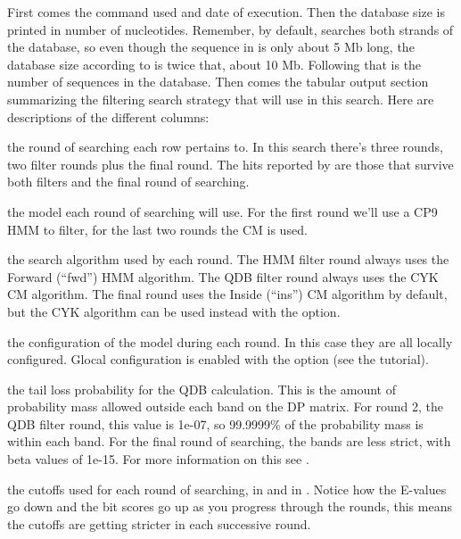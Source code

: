 First comes the command used and date of execution. Then the database
size is printed in number of nucleotides. Remember, by default,
 searches both strands of the database, so even though
the sequence in  is only about 5 Mb
long, the database size according to  is twice that,
about 10 Mb. Following that is the number of sequences in the
database. Then comes the tabular output section summarizing the
filtering search strategy that  will use in this
search. Here are descriptions of the different columns:

\begin{wideitem}
\item[\emprog{rnd}] the round of searching each row pertains
  to. In this search there's three rounds, two filter rounds plus
  the final round. The hits reported by  are those that
  survive both filters and the final round of searching.

\item[\emprog{mod}] the model each round of searching will use. For
  the first round we'll use a CP9 HMM to filter, for the last two
  rounds the CM is used.

\item[\emprog{alg}] the search algorithm used by each round. 
  The HMM filter round always uses the Forward (``fwd'') HMM algorithm. 
  The QDB filter round always uses the CYK CM algorithm. The final
  round uses the Inside (``ins'') CM algorithm by default, but the 
  CYK algorithm can be used instead with the  option. 

\item[\emprog{cfg}] the configuration of the model during each
  round. In this case they are all locally configured. Glocal
  configuration is enabled with the  option (see the tutorial).

\item[\emprog{beta}] the tail loss probability for the QDB
  calculation. This is the amount of probability mass allowed outside
  each band on the DP matrix. For round 2, the QDB filter round, this
  value is 1e-07, so 99.9999\% of the probability mass is within each
  band. For the final round of searching, the bands are less strict,
  with beta values of 1e-15. For more information on this see
  \cite{NawrockiEddy07}.

\item[\emprog{cutoffs}] the cutoffs used for each round of searching,
  in  and in . Notice how the E-values go
  down and the bit scores go up as you progress through the rounds,
  this means the cutoffs are getting stricter in each successive
  round. 


\end{wideitem}
